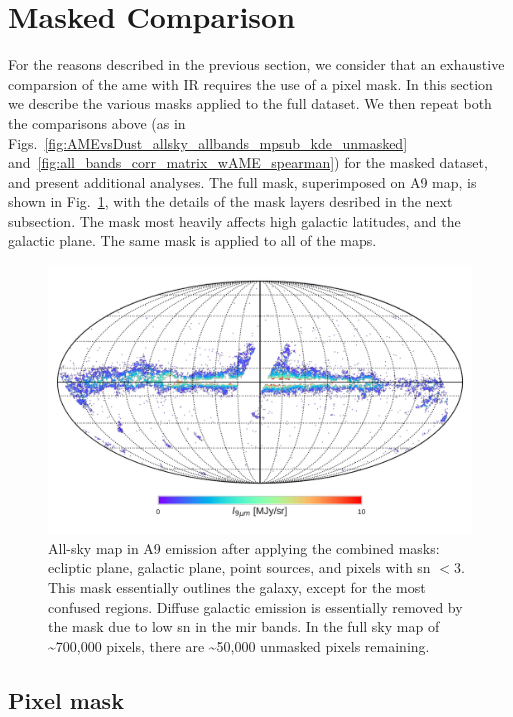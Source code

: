       \section{Masked Comparison}
        For the reasons described in the previous section, we consider that an exhaustive comparsion of the \gls{ame} with IR requires the use of a pixel mask. In this section we describe the various masks applied to the full dataset. We then repeat both the comparisons above (as in  Figs.~\ref{fig:AMEvsDust_allsky_allbands_mpsub_kde_unmasked} and~\ref{fig:all_bands_corr_matrix_wAME_spearman}) for the masked dataset, and present additional analyses. The full mask, superimposed on A9 map, is shown in Fig.~\ref{fig:A9_masked_map}, with the details of the mask layers desribed in the next subsection. The mask most heavily affects high galactic latitudes, and the galactic plane. The same mask is applied to all of the maps.
          \begin{figure}
            \includegraphics[width=\textwidth]{../Plots/ch_allsky/masked_map_A9.pdf}
            \centering
            \caption{All-sky map in A9 emission after applying the combined masks: ecliptic plane, galactic plane, point sources, and pixels with \gls{sn} $<3$. This mask essentially outlines the galaxy, except for the most confused regions. Diffuse galactic emission is essentially removed by the mask due to low \gls{sn} in the \gls{mir} bands. In the full sky map of \textasciitilde{}700,000 pixels, there are \textasciitilde{}50,000 unmasked pixels remaining.}
            \label{fig:A9_masked_map}
          \end{figure}

      \subsection{Pixel mask}
      \label{sec:pixmask}
